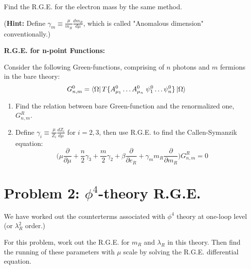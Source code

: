 \documentclass[11pt]{article}
\begin{document}
\begin{enumerate}
\begin{problem}{\points{-}}
\begin{problem}{\points{-}}
			Find the R.G.E. for the electron mass by the same method.
			
			(\textbf{Hint:} Define $\gamma_m \equiv \frac{\mu}{m_R} \frac{dm_R}{d\mu}$, which is called "Anomalous dimension" conventionally.)
		\end{problem}
			
			
			\item 
			\begin{problem}{\points{-}}
				\textbf{R.G.E. for n-point Functions:}
				
				Consider the following Green-functions, comprising of $n$ photons and $m$ fermions in the bare theory:
				\[
				G_{n,m}^0 = \bra{\Omega} T\{
				A_{\mu_1}^0 \dots A_{\mu_n}^0
				\; 
				\psi_1^0 \dots \psi_n^0
				\}
				\ket{\Omega}
				\]
				\begin{enumerate}
					\item Find the relation between bare Green-function and the renormalized one, $G_{n,m}^R$.
					\item Define $\gamma_i \equiv \frac{\mu}{Z_i} \frac{dZ_i}{d\mu}$ for $i=2,3$, then use R.G.E. to find the Callen-Symanzik equation:
					\[
					\big(
					\mu \frac{\partial}{\partial \mu} + \frac{n}{2} \gamma_3 + \frac{m}{2}\gamma_2 + \beta \frac{\partial}{\partial e_R} + \gamma_m m_R \frac{\partial}{\partial m_R} 
					\big) G_{n,m}^R =0
					\]
				\end{enumerate}
			\end{problem}
		\end{problem}
	\end{enumerate}
	
	\newpage

	\section*{Problem 2: $\phi^4$-theory R.G.E. }
 


\begin{problem}
	We have worked out the counterterms associated with $\phi^4$ theory at one-loop level (or $\lambda_R^2$ order.)
	
	For this problem, work out the R.G.E. for $m_R$ and $\lambda_R$ in this theory. Then find the running of these parameters with $\mu$ scale by solving the R.G.E. differential equation.
	\end{problem}
\end{document}
